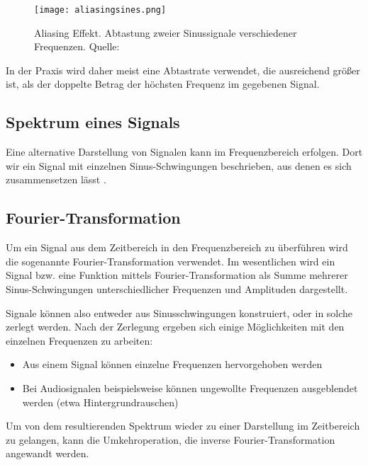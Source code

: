 \begin{figure}[ht]
	\centering
	\texttt{[image: aliasingsines.png]}
	\caption[Aliasing Effekt. Abtastung zweier Sinussignale verschiedener Frequenzen]{Aliasing Effekt. Abtastung zweier Sinussignale verschiedener Frequenzen. \newline Quelle: \cite[Moxfyre]{aliasingsampling:2009}} 
	\label{abtasttheorem}
\end{figure}

In der Praxis wird daher meist eine Abtastrate verwendet, die ausreichend größer ist, als der doppelte Betrag der höchsten Frequenz im gegebenen Signal.





\subsection{Spektrum eines Signals}
Eine alternative Darstellung von Signalen kann im Frequenzbereich erfolgen. Dort wir ein Signal mit einzelnen Sinus-Schwingungen beschrieben, aus denen es sich zusammensetzen lässt \cite[vgl. Karrenberg, S. 42]{Karrenberg:2017}.





\subsection{Fourier-Transformation}
Um ein Signal aus dem Zeitbereich in den Frequenzbereich zu überführen wird die sogenannte Fourier-Transformation verwendet.\newline
Im wesentlichen wird ein Signal bzw. eine Funktion mittels Fourier-Transformation als Summe mehrerer Sinus-Schwingungen unterschiedlicher Frequenzen und Amplituden dargestellt.

Signale können also entweder aus Sinusschwingungen konstruiert, oder in solche zerlegt werden.
Nach der Zerlegung ergeben sich einige Möglichkeiten mit den einzelnen Frequenzen zu arbeiten:
\begin{itemize}
	\item Aus einem Signal können einzelne Frequenzen hervorgehoben werden
	\item Bei Audiosignalen beispielsweise können ungewollte Frequenzen ausgeblendet werden (etwa Hintergrundrauschen)
\end{itemize}

Um von dem resultierenden Spektrum wieder zu einer Darstellung im Zeitbereich zu gelangen, kann die Umkehroperation, die inverse Fourier-Transformation angewandt werden.

